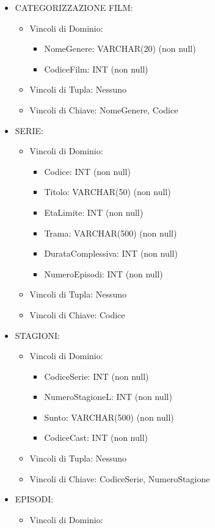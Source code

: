 \documentclass[a4paper,12pt]{report}
\begin{document}
\begin{itemize}
	\item CATEGORIZZAZIONE FILM:
	\begin{itemize}
		\item Vincoli di Dominio:
		\begin{itemize}
			\item NomeGenere: VARCHAR(20) (non null)
			\item CodiceFilm: INT (non null)
		\end{itemize}
		\item Vincoli di Tupla: Nessuno
		\item Vincoli di Chiave: NomeGenere, Codice
	\end{itemize}
	\item SERIE:
	\begin{itemize}
		\item Vincoli di Dominio:
		\begin{itemize}
			\item Codice: INT (non null)
			\item Titolo: VARCHAR(50) (non null)
			\item EtaLimite: INT (non null)
			\item Trama: VARCHAR(500) (non null)
			\item DurataComplessiva: INT (non null)
			\item NumeroEpisodi: INT (non null)
		\end{itemize}
		\item Vincoli di Tupla: Nessuno
		\item Vincoli di Chiave: Codice
	\end{itemize}
	\item STAGIONI:
	\begin{itemize}
		\item Vincoli di Dominio:
		\begin{itemize}
			\item CodiceSerie: INT (non null)
			\item NumeroStagioneL: INT (non null)
			\item Sunto: VARCHAR(500) (non null)
			\item CodiceCast: INT (non null)
		\end{itemize}
		\item Vincoli di Tupla: Nessuno
		\item Vincoli di Chiave: CodiceSerie, NumeroStagione
	\end{itemize}
	\item EPISODI:
	\begin{itemize}
		\item Vincoli di Dominio:

\end{itemize}
\end{itemize}
\end{document}
